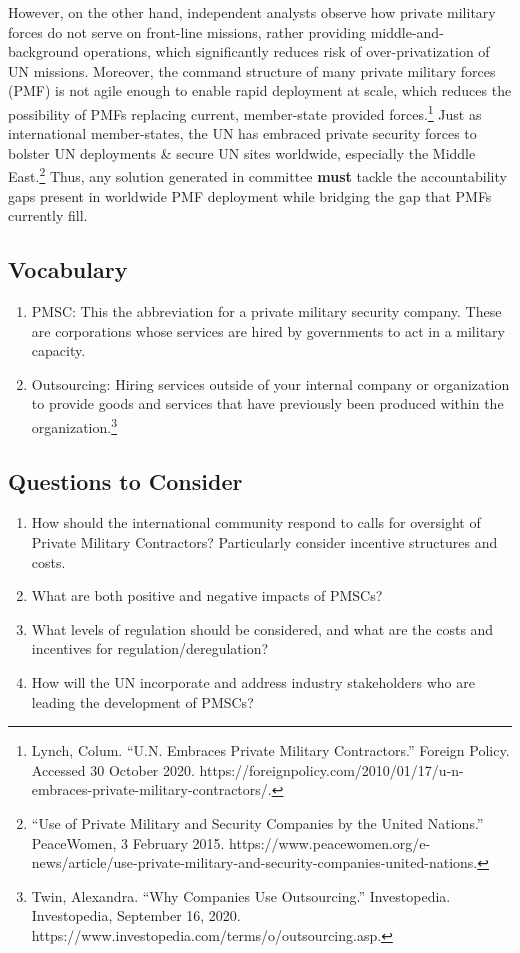 \documentclass[10pt, letterpaper]{article}
\begin{document}
However, on the other hand, independent analysts observe how private
military forces do not serve on front-line missions, rather providing
middle-and-background operations, which significantly reduces risk of
over-privatization of UN missions. Moreover, the command structure of
many private military forces (PMF) is not agile enough to enable rapid
deployment at scale, which reduces the possibility of PMFs replacing
current, member-state provided forces.\footnote{Lynch, Colum. ``U.N.
  Embraces Private Military Contractors.'' Foreign Policy. Accessed 30
  October 2020.
  https://foreignpolicy.com/2010/01/17/u-n-embraces-private-military-contractors/.}
Just as international member-states, the UN has embraced private
security forces to bolster UN deployments \& secure UN sites worldwide,
especially the Middle East.\footnote{``Use of Private Military and
  Security Companies by the United Nations.'' PeaceWomen, 3 February
  2015.
  https://www.peacewomen.org/e-news/article/use-private-military-and-security-companies-united-nations.}
Thus, any solution generated in committee \textbf{must} tackle the
accountability gaps present in worldwide PMF deployment while bridging
the gap that PMFs currently fill. \\

\subsection{Vocabulary}

\begin{enumerate}
\def\labelenumi{\arabic{enumi}.}
\item
  PMSC: This the abbreviation for a private military security company.
  These are corporations whose services are hired by governments to act
  in a military capacity.
\item
  Outsourcing: Hiring services outside of your internal company or
  organization to provide goods and services that have previously been
  produced within the organization.\footnote{Twin, Alexandra. ``Why
    Companies Use Outsourcing.'' Investopedia. Investopedia, September
    16, 2020. https://www.investopedia.com/terms/o/outsourcing.asp.}
\end{enumerate}

\subsection{Questions to Consider}

\begin{enumerate}
\def\labelenumi{\arabic{enumi}.}
\item
  How should the international community respond to calls for oversight
  of Private Military Contractors? Particularly consider incentive
  structures and costs.
\item
  What are both positive and negative impacts of PMSCs?
\item
  What levels of regulation should be considered, and what are the costs
  and incentives for regulation/deregulation?
\item
  How will the UN incorporate and address industry stakeholders who are
  leading the development of PMSCs?
\end{enumerate}
\end{document}
